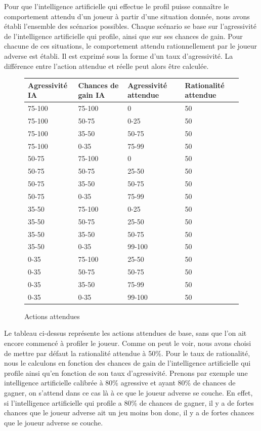 \documentclass{report}
\begin{document}
Pour que l'intelligence artificielle qui effectue le profil puisse connaître le comportement attendu d'un joueur à partir d'une situation donnée, nous avons établi l'ensemble des scénarios possibles. Chaque scénario se base sur l'agressivité de l'intelligence artificielle qui profile, ainsi que sur ses chances de gain. Pour chacune de ces situations, le comportement attendu rationnellement par le joueur adverse est établi. Il est exprimé sous la forme d'un taux d'agressivité. La différence entre l’action attendue et réelle peut alors être calculée.

\begin{figure}[H]
\begin{center}
\begin{tabular}{|l|l|l|l|}
	\hline
   Agressivité IA & Chances de gain IA & Agressivité attendue & Rationalité attendue\\
   \hline
   75-100 & 75-100 & 0 & 50\\
   \hline
   75-100 & 50-75 & 0-25 & 50\\
   \hline
   75-100 & 35-50 & 50-75 & 50\\
   \hline
   75-100 & 0-35 & 75-99 & 50\\
   \hline
   50-75 & 75-100 & 0 & 50\\
   \hline
   50-75 & 50-75 & 25-50 & 50\\
   \hline
   50-75 & 35-50 & 50-75 & 50\\
   \hline
   50-75 & 0-35 & 75-99 & 50\\
   \hline
   35-50 & 75-100 & 0-25 & 50\\
   \hline
   35-50 & 50-75 & 25-50 & 50\\
   \hline
   35-50 & 35-50 & 50-75 & 50\\
   \hline
   35-50 & 0-35 & 99-100 & 50\\
   \hline
   0-35	 & 75-100 & 25-50 & 50\\
   \hline
   0-35 & 50-75 & 50-75 & 50\\
   \hline
   0-35 & 35-50 & 75-99 & 50\\
   \hline
   0-35 & 0-35 & 99-100 & 50\\
   \hline
\end{tabular}	
\end{center}
\caption{Actions attendues}
\end{figure}

Le tableau ci-dessus représente les actions attendues de base, sans que l'on ait encore commencé à profiler le joueur. Comme on peut le voir, nous avons choisi de mettre par défaut la rationalité attendue à 50\%. Pour le taux de rationalité, nous le calculons en fonction des chances de gain de l'intelligence artificielle qui profile ainsi qu'en fonction de son taux d'agressivité. Prenons par exemple une intelligence artificielle calibrée à 80\% agressive et ayant 80\% de chances de gagner, on s'attend dans ce cas là à ce que le joueur adverse se couche. En effet, si l'intelligence artificielle qui profile a 80\% de chances de gagner, il y a de fortes chances que le joueur adverse ait un jeu moins bon donc, il y a de fortes chances que le joueur adverse se couche.\\
\end{document}
